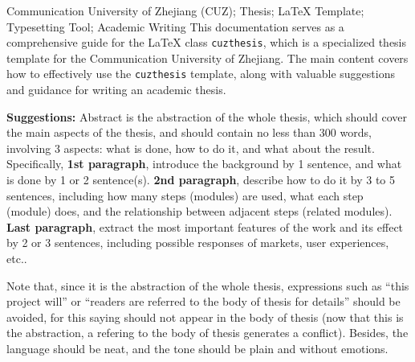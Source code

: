 \begin{englishabstract}
	{Communication University of Zhejiang (CUZ); Thesis; \LaTeX{} Template;
		Typesetting Tool; Academic Writing} This documentation serves as a comprehensive
	guide for the \LaTeX{} class \texttt{cuzthesis}, which is a specialized thesis
	template for the Communication University of Zhejiang. The main content covers
	how to effectively use the \texttt{cuzthesis} template, along with valuable
	suggestions and guidance for writing an academic thesis.

	\begin{leftbar}
		\noindent\textbf{Suggestions:} Abstract is the abstraction of the whole
		thesis, which should cover the main aspects of the thesis, and should
		contain no less than 300 words, involving 3 aspects: what is done, how
		to do it, and what about the result. Specifically, \textbf{1st
			paragraph}, introduce the background by 1 sentence, and what is done by
		1 or 2 sentence(s). \textbf{2nd paragraph}, describe how to do it by 3
		to 5 sentences, including how many steps (modules) are used, what each
		step (module) does, and the relationship between adjacent steps (related
		modules). \textbf{Last paragraph}, extract the most important features
		of the work and its effect by 2 or 3 sentences, including possible
		responses of markets, user experiences, etc..

		\noindent Note that, since it is the abstraction of the whole thesis,
		expressions such as ``this project will'' or ``readers are referred to
		the body of thesis for details'' should be avoided, for this saying
		should not appear in the body of thesis (now that this is the
		abstraction, a refering to the body of thesis generates a conflict).
		Besides, the language should be neat, and the tone should be plain and
		without emotions.
	\end{leftbar}
\end{englishabstract}